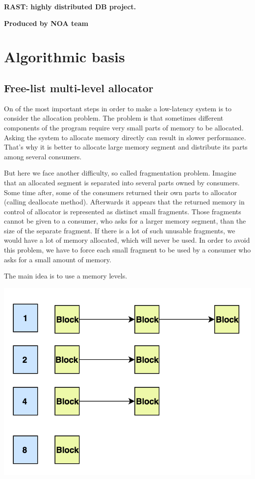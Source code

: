 \documentclass{article}
\begin{document}
\begin{center}
 \Large{\bf RAST: highly distributed DB project.}

{\large {\bf Produced by NOA team}}
\end{center}

\tableofcontents

\newpage
\section{Algorithmic basis}

\subsection{Free-list multi-level allocator}

On of the most important steps in order to make a low-latency system is to consider the allocation problem. The problem is that sometimes different components of the program require very small parts of memory to be allocated. Asking the system to allocate memory directly can result in slower performance. That's why it is better to allocate large memory segment and distribute its parts among several consumers.

But here we face another difficulty, so called fragmentation problem. Imagine that an allocated segment is separated into several parts owned by consumers. Some time after, some of the consumers returned their own parts to allocator (calling deallocate method). Afterwards it appears that the returned memory in control of allocator is represented as distinct small fragments. Those fragments cannot be given to a consumer, who asks for a larger memory segment, than the size of the separate fragment. If there is a lot of such unusable fragments, we would have a lot of memory allocated, which will never be used. In order to avoid this problem, we have to force each small fragment to be used by a consumer who asks for a small amount of memory.

The main idea is to use a memory levels.

\begin{center}\includegraphics[width=0.5 \textwidth]{image1.png}\end{center}
\end{document}
